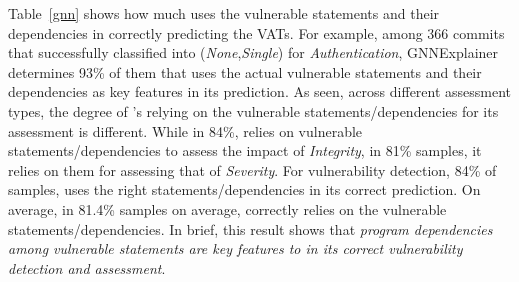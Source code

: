 %



Table~\ref{gnn} shows how much {\tool} uses the vulnerable
statements and their dependencies in correctly predicting the
VATs. For example, among 366 commits that {\tool} successfully
classified into ({\em None},{\em Single}) for {\em Authentication},
GNNExplainer determines 93\% of them that {\tool}
uses the actual vulnerable statements and their dependencies as key
features in its prediction.
As seen, across different assessment types, the degree of {\tool}'s
relying on the vulnerable statements/dependencies for its assessment
is different.  While in 84\%, {\tool} relies on vulnerable
statements/dependencies to assess the impact of {\em Integrity}, in 81\% samples, it relies on them for assessing that of {\em Severity}.
For vulnerability detection, 84\% of samples, {\tool} uses
the right statements/dependencies in its correct prediction.
%
On average, in 81.4\% samples on average, {\tool} correctly
relies on the vulnerable statements/dependencies.
In brief, this result shows that {\em program dependencies among
vulnerable statements are key features to {\tool} in its correct
vulnerability detection and assessment}.



